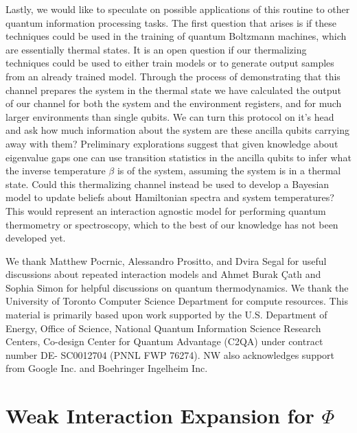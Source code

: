 \documentclass[
 amsmath,amssymb,
 aps,
onecolumn, 
nofootinbib]{revtex4-2}
\begin{document}
Lastly, we would like to speculate on possible applications of this routine to other quantum information processing tasks. The first question that arises is if these techniques could be used in the training of quantum Boltzmann machines, which are essentially thermal states. It is an open question if our thermalizing techniques could be used to either train models or to generate output samples from an already trained model. Through the process of demonstrating that this channel prepares the system in the thermal state we have calculated the output of our channel for both the system and the environment registers, and for much larger environments than single qubits. We can turn this protocol on it's head and ask how much information about the system are these ancilla qubits carrying away with them? Preliminary explorations suggest that given knowledge about eigenvalue gaps one can use transition statistics in the ancilla qubits to infer what the inverse temperature $\beta$ is of the system, assuming the system is in a thermal state. Could this thermalizing channel instead be used to develop a Bayesian model to update beliefs about Hamiltonian spectra and system temperatures? This would represent an interaction agnostic model for performing quantum thermometry or spectroscopy, which to the best of our knowledge has not been developed yet. 

\begin{acknowledgments}
We thank Matthew Pocrnic, Alessandro Prositto, and Dvira Segal for useful discussions about repeated interaction models and Ahmet Burak Çatlı and Sophia Simon for helpful discussions on quantum thermodynamics. We thank the University of Toronto Computer Science Department for compute resources. This material is primarily based upon work supported by the U.S. Department of Energy, Office of Science, National Quantum Information Science Research Centers, Co-design Center for Quantum Advantage (C2QA) under contract number DE- SC0012704 (PNNL FWP 76274).  NW also acknowledges support from Google Inc. and Boehringer Ingelheim Inc.
\end{acknowledgments}



\appendix 


\section{Weak Interaction Expansion for $\Phi$} \label{sec:weak_coupling}
\end{document}
